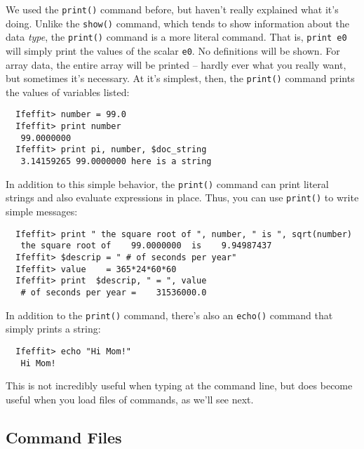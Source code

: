 \documentclass[11pt]{article}
\begin{document}
We used the {\tt{print()}} command before, but haven't really explained
what it's doing. Unlike the {\tt{show()}} command, which tends to
show information about the data {\emph{type}}, the {\tt{print()}}
command is a more literal command.  That is, {\tt{print e0}} will simply
print the values of the scalar {\tt{e0}}.  No definitions will be shown.
For array data, the entire array will be printed -- hardly ever what you
really want, but sometimes it's necessary.  At it's simplest, then, the
{\tt{print()}} command prints the values of variables listed:

{\small\begin{verbatim} 
  Ifeffit> number = 99.0 
  Ifeffit> print number 
   99.0000000 
  Ifeffit> print pi, number, $doc_string 
   3.14159265 99.0000000 here is a string
\end{verbatim}
}\noindent %
In addition to this simple behavior, the {\tt{print()}} command can print
literal strings and also evaluate expressions in place.  Thus, you can use
{\tt{print()}} to write simple messages:
{\small\begin{verbatim}
  Ifeffit> print " the square root of ", number, " is ", sqrt(number)
   the square root of    99.0000000  is    9.94987437
  Ifeffit> $descrip = " # of seconds per year"
  Ifeffit> value    = 365*24*60*60
  Ifeffit> print  $descrip, " = ", value
   # of seconds per year =    31536000.0
\end{verbatim}
}\noindent
In addition to the {\tt{print()}} command, there's also an {\tt{echo()}}
command that simply prints a string:
{\small\begin{verbatim} 
  Ifeffit> echo "Hi Mom!"
   Hi Mom!
\end{verbatim}
}\noindent %
This is not incredibly useful when typing at the command line, but does
become useful when you load files of {\ifeffit} commands, as we'll see
next. 

\subsection{Command Files}
\label{s:datatypes:load}
\end{document}
